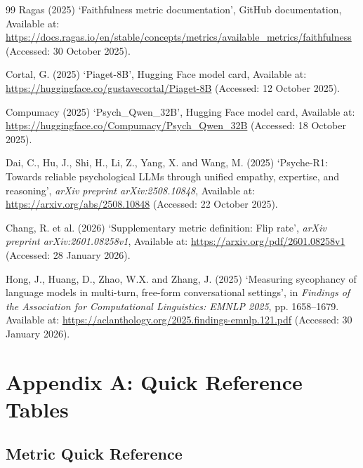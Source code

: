\documentclass[11pt,a4paper]{article}
\begin{document}
\begin{thebibliography}{99}
Ragas (2025)
`Faithfulness metric documentation', GitHub documentation, Available at: \url{https://docs.ragas.io/en/stable/concepts/metrics/available_metrics/faithfulness} (Accessed: 30 October 2025).

Cortal, G. (2025)
`Piaget-8B', Hugging Face model card, Available at: \url{https://huggingface.co/gustavecortal/Piaget-8B} (Accessed: 12 October 2025).

Compumacy (2025)
`Psych\_Qwen\_32B', Hugging Face model card, Available at: \url{https://huggingface.co/Compumacy/Psych_Qwen_32B} (Accessed: 18 October 2025).

Dai, C., Hu, J., Shi, H., Li, Z., Yang, X. and Wang, M. (2025)
`Psyche-R1: Towards reliable psychological LLMs through unified empathy, expertise, and reasoning', \emph{arXiv preprint arXiv:2508.10848}, Available at: \url{https://arxiv.org/abs/2508.10848} (Accessed: 22 October 2025).

Chang, R. et al. (2026)
`Supplementary metric definition: Flip rate', \emph{arXiv preprint arXiv:2601.08258v1}, Available at: \url{https://arxiv.org/pdf/2601.08258v1} (Accessed: 28 January 2026).

Hong, J., Huang, D., Zhao, W.X. and Zhang, J. (2025)
`Measuring sycophancy of language models in multi-turn, free-form conversational settings', in \emph{Findings of the Association for Computational Linguistics: EMNLP 2025}, pp. 1658--1679. Available at: \url{https://aclanthology.org/2025.findings-emnlp.121.pdf} (Accessed: 30 January 2026).

\end{thebibliography}

\newpage
\section*{Appendix A: Quick Reference Tables}

\subsection*{Metric Quick Reference}
\end{document}

